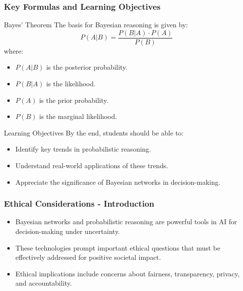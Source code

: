 \documentclass[aspectratio=169]{beamer}
\begin{document}
\begin{frame}[fragile]
    \frametitle{Key Formulas and Learning Objectives}
    \begin{block}{Bayes' Theorem}
        The basis for Bayesian reasoning is given by:
        \begin{equation}
        P(A|B) = \frac{P(B|A) \cdot P(A)}{P(B)}
        \end{equation}
        where:
        \begin{itemize}
            \item $P(A|B)$ is the posterior probability.
            \item $P(B|A)$ is the likelihood.
            \item $P(A)$ is the prior probability.
            \item $P(B)$ is the marginal likelihood.
        \end{itemize}
    \end{block}
    
    \begin{block}{Learning Objectives}
        By the end, students should be able to:
        \begin{itemize}
            \item Identify key trends in probabilistic reasoning.
            \item Understand real-world applications of these trends.
            \item Appreciate the significance of Bayesian networks in decision-making.
        \end{itemize}
    \end{block}
\end{frame}

\begin{frame}[fragile]
    \frametitle{Ethical Considerations - Introduction}
    \begin{itemize}
        \item Bayesian networks and probabilistic reasoning are powerful tools in AI for decision-making under uncertainty.
        \item These technologies prompt important ethical questions that must be effectively addressed for positive societal impact.
        \item Ethical implications include concerns about fairness, transparency, privacy, and accountability.
    \end{itemize}
\end{frame}
\end{document}
